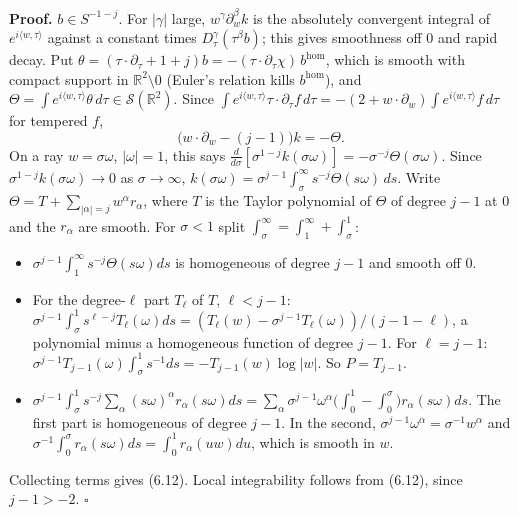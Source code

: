 \documentclass[
  11pt,
]{article}
\providecommand{\tightlist}{%
  \setlength{\itemsep}{0pt}\setlength{\parskip}{0pt}}
\begin{document}
\textbf{Proof.} \(b\in S^{-1-j}\). For \(|\gamma|\) large,
\(w^\gamma\partial^\beta_wk\) is the absolutely convergent integral of
\(e^{i\langle w,\tau\rangle}\) against a constant times
\(D^\gamma_\tau(\tau^\beta b)\); this gives smoothness off 0 and rapid
decay. Put
\(\theta=(\tau\cdot\partial_\tau+1+j)b=-(\tau\cdot\partial_\tau\chi)\,b^{\mathrm{hom}}\),
which is smooth with compact support in \(\mathbb R^2\setminus0\)
(Euler's relation kills \(b^{\mathrm{hom}}\)), and
\(\Theta=\int e^{i\langle w,\tau\rangle}\theta\,d\tau\in\mathcal S(\mathbb R^2)\).
Since
\(\int e^{i\langle w,\tau\rangle}\tau\cdot\partial_\tau f\,d\tau=-(2+w\cdot\partial_w)\int e^{i\langle w,\tau\rangle}f\,d\tau\)
for tempered \(f\), \[
\big(w\cdot\partial_w-(j-1)\big)k=-\Theta .
\tag{6.13}
\] On a ray \(w=\sigma\omega\), \(|\omega|=1\), this says
\(\frac d{d\sigma}[\sigma^{1-j}k(\sigma\omega)]=-\sigma^{-j}\Theta(\sigma\omega)\).
Since \(\sigma^{1-j}k(\sigma\omega)\to0\) as \(\sigma\to\infty\),
\(k(\sigma\omega)=\sigma^{j-1}\int_\sigma^\infty s^{-j}\Theta(s\omega)\,ds\).
Write \(\Theta=T+\sum_{|\alpha|=j}w^\alpha r_\alpha\), where \(T\) is
the Taylor polynomial of \(\Theta\) of degree \(j-1\) at 0 and the
\(r_\alpha\) are smooth. For \(\sigma<1\) split
\(\int_\sigma^\infty=\int_1^\infty+\int_\sigma^1\):

\begin{itemize}
\tightlist
\item
  \(\sigma^{j-1}\int_1^\infty s^{-j}\Theta(s\omega)ds\) is homogeneous
  of degree \(j-1\) and smooth off 0.
\item
  For the degree-\(\ell\) part \(T_\ell\) of \(T\), \(\ell<j-1\):
  \(\sigma^{j-1}\int_\sigma^1s^{\ell-j}T_\ell(\omega)ds=(T_\ell(w)-\sigma^{j-1}T_\ell(\omega))/(j-1-\ell)\),
  a polynomial minus a homogeneous function of degree \(j-1\). For
  \(\ell=j-1\):
  \(\sigma^{j-1}T_{j-1}(\omega)\int_\sigma^1s^{-1}ds=-T_{j-1}(w)\log|w|\).
  So \(P=T_{j-1}\).
\item
  \(\sigma^{j-1}\int_\sigma^1s^{-j}\sum_\alpha(s\omega)^\alpha r_\alpha(s\omega)ds=\sum_\alpha\sigma^{j-1}\omega^\alpha\big(\int_0^1-\int_0^\sigma\big)r_\alpha(s\omega)ds\).
  The first part is homogeneous of degree \(j-1\). In the second,
  \(\sigma^{j-1}\omega^\alpha=\sigma^{-1}w^\alpha\) and
  \(\sigma^{-1}\int_0^\sigma r_\alpha(s\omega)ds=\int_0^1r_\alpha(uw)du\),
  which is smooth in \(w\).
\end{itemize}

Collecting terms gives (6.12). Local integrability follows from (6.12),
since \(j-1>-2\). \(\square\)
\end{document}
